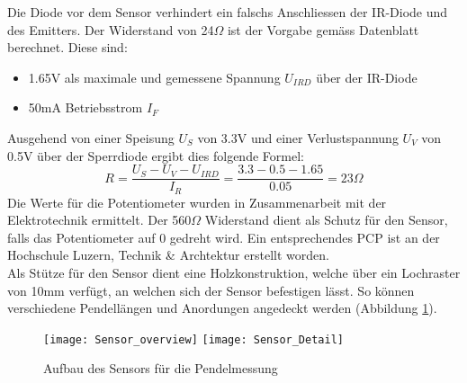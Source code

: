 	Die Diode vor dem Sensor verhindert ein falschs Anschliessen der IR-Diode und des Emitters. Der Widerstand von 24$\Omega$ ist der Vorgabe gemäss Datenblatt berechnet. Diese sind:
	\begin{itemize}
		\item 1.65V als maximale und gemessene Spannung $U_{IRD}$ über der IR-Diode
		\item 50mA Betriebsstrom $I_F$
	\end{itemize}
	Ausgehend von einer Speisung $U_S$ von 3.3V und einer Verlustspannung $U_V$ von 0.5V über der Sperrdiode ergibt dies folgende Formel:
	\[
		R = \frac{U_S - U_V - U_{IRD}}{I_R} = \frac{3.3 - 0.5 - 1.65}{0.05} = 23\Omega
	\]
	Die Werte für die Potentiometer wurden in Zusammenarbeit mit der Elektrotechnik ermittelt. Der 560$\Omega$ Widerstand dient als Schutz für den Sensor, falls das Potentiometer auf 0 gedreht wird. Ein entsprechendes PCP ist an der Hochschule Luzern, Technik \& Archtektur erstellt worden.\\
	Als Stütze für den Sensor dient eine Holzkonstruktion, welche über ein Lochraster von 10mm verfügt, an welchen sich der Sensor befestigen lässt. So können verschiedene Pendellängen und Anordungen angedeckt werden (Abbildung \ref{fig:Sensor_overview}).
	\begin{figure}[H]
		\centering
		\texttt{[image: Sensor\_overview]}
		\texttt{[image: Sensor\_Detail]}
		\caption{Aufbau des Sensors für die Pendelmessung}
		\label{fig:Sensor_overview}
	\end{figure}